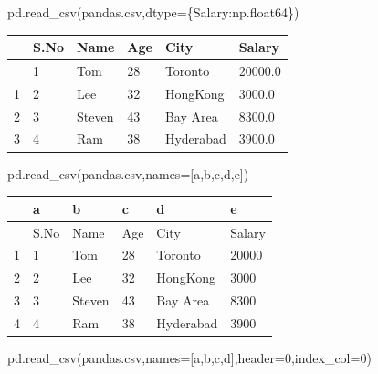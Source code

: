 \documentclass[
  a4paper,
  DIV=11,
  numbers=noendperiod]{scrreprt}
\newenvironment{Shaded}{\begin{snugshade}}{\end{snugshade}}
\newcommand{\DecValTok}[1]{\textcolor[rgb]{0.68,0.00,0.00}{#1}}
\newcommand{\NormalTok}[1]{\textcolor[rgb]{0.00,0.23,0.31}{#1}}
\newcommand{\OperatorTok}[1]{\textcolor[rgb]{0.37,0.37,0.37}{#1}}
\newcommand{\StringTok}[1]{\textcolor[rgb]{0.13,0.47,0.30}{#1}}
\begin{document}
\begin{Shaded}
\begin{Highlighting}[]
\NormalTok{pd.read\_csv(}\StringTok{\textquotesingle{}pandas.csv\textquotesingle{}}\NormalTok{,dtype}\OperatorTok{=}\NormalTok{\{}\StringTok{\textquotesingle{}Salary\textquotesingle{}}\NormalTok{:np.float64\})}
\end{Highlighting}
\end{Shaded}

\begin{longtable}[]{@{}llllll@{}}
\toprule\noalign{}
& S.No & Name & Age & City & Salary \\
\midrule\noalign{}
\endhead
\bottomrule\noalign{}
\endlastfoot
0 & 1 & Tom & 28 & Toronto & 20000.0 \\
1 & 2 & Lee & 32 & HongKong & 3000.0 \\
2 & 3 & Steven & 43 & Bay Area & 8300.0 \\
3 & 4 & Ram & 38 & Hyderabad & 3900.0 \\
\end{longtable}

\begin{Shaded}
\begin{Highlighting}[]
\NormalTok{pd.read\_csv(}\StringTok{\textquotesingle{}pandas.csv\textquotesingle{}}\NormalTok{,names}\OperatorTok{=}\NormalTok{[}\StringTok{\textquotesingle{}a\textquotesingle{}}\NormalTok{,}\StringTok{\textquotesingle{}b\textquotesingle{}}\NormalTok{,}\StringTok{\textquotesingle{}c\textquotesingle{}}\NormalTok{,}\StringTok{\textquotesingle{}d\textquotesingle{}}\NormalTok{,}\StringTok{\textquotesingle{}e\textquotesingle{}}\NormalTok{])}
\end{Highlighting}
\end{Shaded}

\begin{longtable}[]{@{}llllll@{}}
\toprule\noalign{}
& a & b & c & d & e \\
\midrule\noalign{}
\endhead
\bottomrule\noalign{}
\endlastfoot
0 & S.No & Name & Age & City & Salary \\
1 & 1 & Tom & 28 & Toronto & 20000 \\
2 & 2 & Lee & 32 & HongKong & 3000 \\
3 & 3 & Steven & 43 & Bay Area & 8300 \\
4 & 4 & Ram & 38 & Hyderabad & 3900 \\
\end{longtable}

\begin{Shaded}
\begin{Highlighting}[]
\NormalTok{pd.read\_csv(}\StringTok{\textquotesingle{}pandas.csv\textquotesingle{}}\NormalTok{,names}\OperatorTok{=}\NormalTok{[}\StringTok{\textquotesingle{}a\textquotesingle{}}\NormalTok{,}\StringTok{\textquotesingle{}b\textquotesingle{}}\NormalTok{,}\StringTok{\textquotesingle{}c\textquotesingle{}}\NormalTok{,}\StringTok{\textquotesingle{}d\textquotesingle{}}\NormalTok{],header}\OperatorTok{=}\DecValTok{0}\NormalTok{,index\_col}\OperatorTok{=}\DecValTok{0}\NormalTok{)}
\end{Highlighting}
\end{Shaded}
\end{document}

